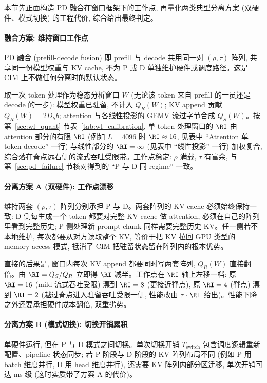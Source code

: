本节先正面构造 PD 融合在窗口框架下的工作点, 再量化两类典型分离方案 (双硬件、模式切换) 的工程代价, 综合给出最终判定。

\paragraph{融合方案: 维持窗口工作点}
PD 融合 (prefill-decode fusion) 即 prefill 与 decode 共用同一对 $(\rho, \tau)$ 阵列, 共享同一份模型权重与 KV cache, 不为 P 或 D 单独维护硬件或调度路径。这是 CIM 上不做任何分离时的默认状态。

取一次 token 处理作为稳态分析窗口 $W$ (无论该 token 来自 prefill 的一员还是 decode 的一步): 模型权重已驻留, 不计入 $Q_R(W)$; KV append 贡献 $Q_R(W) = 2 D_h b$; attention 与各线性投影的 GEMV 流过字节合成 $Q_S(W)$。按第~\ref{sec:wl_quant} 节表~\ref{tab:wl_calibration}, 单 token 处理窗口的 $\RI$ 由 attention 部分的有限 $\RI$ (例如 $L = 4096$ 时 $\RI \approx 16$, 见表中 “Attention 单 token decode” 一行) 与线性部分的 $\RI = \infty$ (见表中 “线性投影” 一行) 加权复合, 综合落在脊点远右侧的流式吞吐受限带。工作点稳定: $\rho$ 满载, $\tau$ 有富余, 与第~\ref{sec:pd_failure} 节核对得到的 “P 与 D 同 regime” 一致。

\paragraph{分离方案 A (双硬件): 工作点漂移}
维持两套 $(\rho, \tau)$ 阵列分别承担 P 与 D。两套阵列的 KV cache 必须始终保持一致: D 侧每生成一个 token 都要对完整 KV cache 做 attention, 必须在自己的阵列里看到完整历史; P 侧处理新 prompt chunk 同样需要完整历史 KV。任一侧若不本地维护, 每次都要从对方读取整个 KV, 等价于把 KV 拉回 GPU 类型的 memory access 模式, 抵消了 CIM 把驻留状态留在阵列内的根本优势。

直接的后果是, 窗口内每次 KV append 都要同时写两套阵列, $Q_R(W)$ 直接翻倍。由 $\RI = Q_S/Q_R$ 立即得 $\RI$ 减半。工作点在 $\RI$ 轴上左移一档: 原 $\RI = 16$ (mild 流式吞吐受限) 漂到 $\RI = 8$ (更接近脊点), 原 $\RI = 4$ (脊点) 漂到 $\RI = 2$ (越过脊点进入驻留吞吐受限一侧, 性能改由 $\tau \cdot \RI$ 给出)。性能下降之外还要承担硬件成本翻倍, 双重劣势。

\paragraph{分离方案 B (模式切换): 切换开销累积}
单硬件运行, 但在 P 与 D 模式之间切换。单次切换开销 $T_{\text{switch}}$ 包含调度逻辑重新配置、pipeline 状态同步; 若 P 阶段与 D 阶段的 KV 阵列布局不同 (例如 P 用 batch 维度并行, D 用 head 维度并行), 还需要 KV 阵列内部分区迁移, 单次开销可达 ms 级 (这时实质带了方案 A 的代价)。

